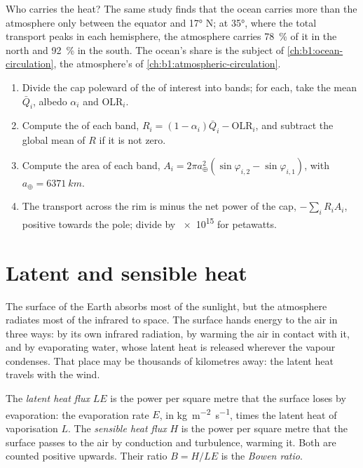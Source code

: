 Who carries the heat? The same study finds that the ocean carries
more than the atmosphere only between the equator and \ang{17} N; at \ang{35},
where the total transport peaks in each hemisphere, the atmosphere carries
\qty{78}{\percent} of it in the north and \qty{92}{\percent} in the south. The
ocean's share is the subject of \cref{ch:b1:ocean-circulation}, the atmosphere's
of \cref{ch:b1:atmospheric-circulation}.

\begin{method}\label{met:b1:radiation-heat-transport:bands}
\begin{enumerate}
  \item Divide the cap poleward of the  of interest into bands; for each,
        take the mean  $\bar Q_i$, albedo $\alpha_i$ and OLR$_i$.
  \item Compute the  of each band, $R_i = (1 - \alpha_i)\bar Q_i -
        \text{OLR}_i$, and subtract the global mean of $R$ if it is not zero.
  \item Compute the area of each band, $A_i = 2\pi a_\oplus^2(\sin\varphi_{i,2} -
        \sin\varphi_{i,1})$, with $a_\oplus = \qty{6371}{km}$.
  \item The transport across the rim is minus the net power of the cap,
        $-\sum_i R_i A_i$, positive towards the pole; divide by \num{e15} for
        petawatts.
\end{enumerate}
\end{method}

\section{Latent and sensible heat}\label{sec:b1:radiation-heat-transport:latent}

The surface of the Earth absorbs most of the sunlight, but the atmosphere radiates
most of the infrared to space. The surface hands energy to the air in three ways:
by its own infrared radiation, by warming the air in contact with it, and by
evaporating water, whose latent heat is released wherever the vapour condenses.
That place may be thousands of kilometres away: the latent heat travels with the
wind.

\begin{definition}\label{def:b1:radiation-heat-transport:surface-fluxes}
The \emph{latent heat flux} $LE$ is the power per square
metre that the surface loses by evaporation: the evaporation rate $E$, in
\unit{kg.m^{-2}.s^{-1}}, times the latent heat of vaporisation $L$. The
\emph{sensible heat flux} $H$ is the power per square
metre that the surface passes to the air by conduction and turbulence, warming
it. Both are counted positive upwards. Their ratio $B = H/LE$ is the
\emph{Bowen ratio}.
\end{definition}

